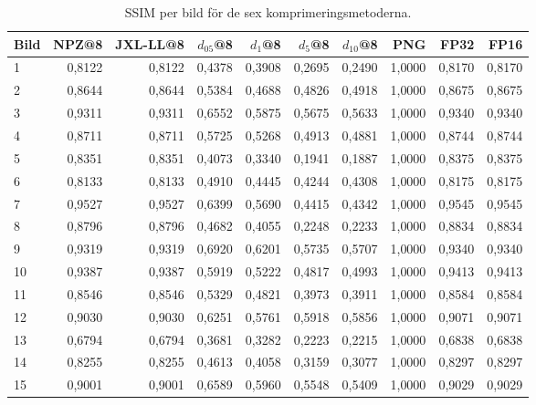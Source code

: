 \begin{table}[H]
\centering
\caption{SSIM per bild för de sex komprimeringsmetoderna.}
\label{tab:ssim_per_image}
{\footnotesize
\begin{tabular}{lrrrrrrrrr}
\hline
\textbf{Bild} & \textbf{NPZ@8} & \textbf{JXL-LL@8} & \boldmath$d_{05}$@8 & \boldmath$d_1$@8 & \boldmath$d_5$@8 & \boldmath$d_{10}$@8 & \textbf{PNG} & \textbf{FP32} & \textbf{FP16} \\
\hline
 1 & 0{,}8122 & 0{,}8122 & 0{,}4378 & 0{,}3908 & 0{,}2695 & 0{,}2490 & 1{,}0000 & 0{,}8170 & 0{,}8170 \\
 2 & 0{,}8644 & 0{,}8644 & 0{,}5384 & 0{,}4688 & 0{,}4826 & 0{,}4918 & 1{,}0000 & 0{,}8675 & 0{,}8675 \\
 3 & 0{,}9311 & 0{,}9311 & 0{,}6552 & 0{,}5875 & 0{,}5675 & 0{,}5633 & 1{,}0000 & 0{,}9340 & 0{,}9340 \\
 4 & 0{,}8711 & 0{,}8711 & 0{,}5725 & 0{,}5268 & 0{,}4913 & 0{,}4881 & 1{,}0000 & 0{,}8744 & 0{,}8744 \\
 5 & 0{,}8351 & 0{,}8351 & 0{,}4073 & 0{,}3340 & 0{,}1941 & 0{,}1887 & 1{,}0000 & 0{,}8375 & 0{,}8375 \\
 6 & 0{,}8133 & 0{,}8133 & 0{,}4910 & 0{,}4445 & 0{,}4244 & 0{,}4308 & 1{,}0000 & 0{,}8175 & 0{,}8175 \\
 7 & 0{,}9527 & 0{,}9527 & 0{,}6399 & 0{,}5690 & 0{,}4415 & 0{,}4342 & 1{,}0000 & 0{,}9545 & 0{,}9545 \\
 8 & 0{,}8796 & 0{,}8796 & 0{,}4682 & 0{,}4055 & 0{,}2248 & 0{,}2233 & 1{,}0000 & 0{,}8834 & 0{,}8834 \\
 9 & 0{,}9319 & 0{,}9319 & 0{,}6920 & 0{,}6201 & 0{,}5735 & 0{,}5707 & 1{,}0000 & 0{,}9340 & 0{,}9340 \\
10 & 0{,}9387 & 0{,}9387 & 0{,}5919 & 0{,}5222 & 0{,}4817 & 0{,}4993 & 1{,}0000 & 0{,}9413 & 0{,}9413 \\
11 & 0{,}8546 & 0{,}8546 & 0{,}5329 & 0{,}4821 & 0{,}3973 & 0{,}3911 & 1{,}0000 & 0{,}8584 & 0{,}8584 \\
12 & 0{,}9030 & 0{,}9030 & 0{,}6251 & 0{,}5761 & 0{,}5918 & 0{,}5856 & 1{,}0000 & 0{,}9071 & 0{,}9071 \\
13 & 0{,}6794 & 0{,}6794 & 0{,}3681 & 0{,}3282 & 0{,}2223 & 0{,}2215 & 1{,}0000 & 0{,}6838 & 0{,}6838 \\
14 & 0{,}8255 & 0{,}8255 & 0{,}4613 & 0{,}4058 & 0{,}3159 & 0{,}3077 & 1{,}0000 & 0{,}8297 & 0{,}8297 \\
15 & 0{,}9001 & 0{,}9001 & 0{,}6589 & 0{,}5960 & 0{,}5548 & 0{,}5409 & 1{,}0000 & 0{,}9029 & 0{,}9029 \\

\end{tabular}}
\end{table}
